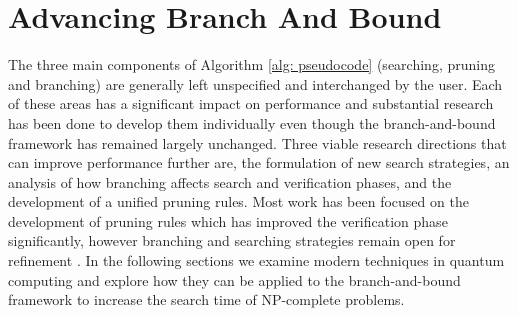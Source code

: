 
\section{Advancing Branch And Bound}
	The three main components of Algorithm \ref{alg: pseudocode} (searching, pruning and branching) are generally left unspecified and interchanged by the user.
	Each of these areas has a significant impact on performance and substantial research has been done to develop them individually even though the branch-and-bound framework has remained largely unchanged. 
	Three viable research directions that can improve performance further are, the formulation of new search strategies, an analysis of how branching affects search and verification phases, and the development of a unified pruning rules. 
	Most work has been focused on the development of pruning rules which has improved the verification phase significantly, however branching and searching strategies remain open for refinement \cite{morrison2016branch}. 
	In the following sections we examine modern techniques in quantum computing and explore how they can be applied to the branch-and-bound framework to increase the search time of NP-complete problems. 